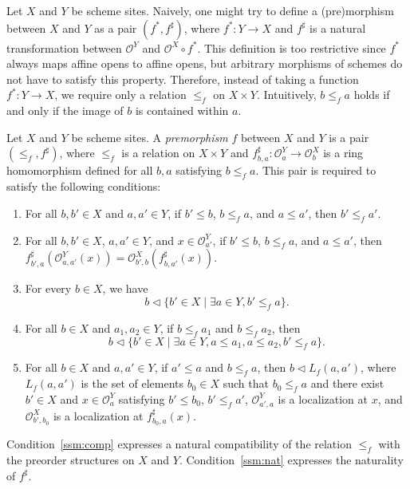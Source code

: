\documentclass[reqno]{amsart}
\theoremstyle{definition}
\theoremstyle{remark}
\numberwithin{figure}{section}
\newcommand{\cover}{\triangleleft}
\begin{document}
Let $X$ and $Y$ be scheme sites.
Naively, one might try to define a (pre)morphism between $X$ and $Y$ as a pair $(f^*,f^\sharp)$,
where $f^* : Y \to X$ and $f^\sharp$ is a natural transformation between $\mathcal{O}^Y$ and $\mathcal{O}^X \circ f^*$.
This definition is too restrictive since $f^*$ always maps affine opens to affine opens, but arbitrary morphisms of schemes do not have to satisfy this property.
Therefore, instead of taking a function $f^* : Y \to X$, we require only a relation $\leq_f$ on $X \times Y$.
Intuitively, $b \leq_f a$ holds if and only if the image of $b$ is contained within $a$.

\begin{defn}[ssm]
Let $X$ and $Y$ be scheme sites.
A \emph{premorphism} $f$ between $X$ and $Y$ is a pair $(\leq_f,f^\sharp)$, where $\leq_f$ is a relation on $X \times Y$ and $f^\sharp_{b,a} : \mathcal{O}^Y_a \to \mathcal{O}^X_b$ is a ring homomorphism defined for all $b,a$ satisfying $b \leq_f a$.
This pair is required to satisfy the following conditions:
\begin{enumerate}
\item \label{ssm:comp} For all $b,b' \in X$ and $a,a' \in Y$, if $b' \leq b$, $b \leq_f a$, and $a \leq a'$, then $b' \leq_f a'$.
\item \label{ssm:nat} For all $b,b' \in X$, $a,a' \in Y$, and $x \in \mathcal{O}^Y_{a'}$, if $b' \leq b$, $b \leq_f a$, and $a \leq a'$, then $f^\sharp_{b',a}(\mathcal{O}^Y_{a,a'}(x)) = \mathcal{O}^X_{b',b}(f^\sharp_{b,a'}(x))$.
\item \label{ssm:top} For every $b \in X$, we have
\[ b \cover \{ b' \in X \mid \exists a \in Y, b' \leq_f a \}. \]
\item \label{ssm:meet} For all $b \in X$ and $a_1,a_2 \in Y$, if $b \leq_f a_1$ and $b \leq_f a_2$, then
\[ b \cover \{ b' \in X \mid \exists a \in Y, a \leq a_1, a \leq a_2, b' \leq_f a \}. \]
\item \label{ssm:loc} For all $b \in X$ and $a,a' \in Y$, if $a' \leq a$ and $b \leq_f a$, then $b \cover L_f(a,a')$, where $L_f(a,a')$ is the set of elements $b_0 \in X$ such that
$b_0 \leq_f a$ and there exist $b' \in X$ and $x \in \mathcal{O}^Y_a$ satisfying $b' \leq b_0$, $b' \leq_f a'$, $\mathcal{O}^Y_{a',a}$ is a localization at $x$, and $\mathcal{O}^X_{b',b_0}$ is a localization at $f^\sharp_{b_0,a}(x)$.
\end{enumerate}
\end{defn}

Condition~\eqref{ssm:comp} expresses a natural compatibility of the relation $\leq_f$ with the preorder structures on $X$ and $Y$.
Condition~\eqref{ssm:nat} expresses the naturality of $f^\sharp$.
\end{document}

